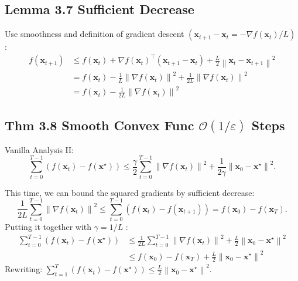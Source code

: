 \subsection*{Lemma 3.7 Sufficient Decrease}
Use smoothness and definition of gradient descent $\left(\mathbf{x}_{t+1}-\mathbf{x}_{t}=-\nabla f\left(\mathbf{x}_{t}\right) / L\right)$ :
$$
\begin{aligned}
f\left(\mathbf{x}_{t+1}\right) & \leq f\left(\mathbf{x}_{t}\right)+\nabla f\left(\mathbf{x}_{t}\right)^{\top}\left(\mathbf{x}_{t+1}-\mathbf{x}_{t}\right)+\frac{L}{2}\left\|\mathbf{x}_{t}-\mathbf{x}_{t+1}\right\|^{2} \\
&=f\left(\mathbf{x}_{t}\right)-\frac{1}{L}\left\|\nabla f\left(\mathbf{x}_{t}\right)\right\|^{2}+\frac{1}{2 L}\left\|\nabla f\left(\mathbf{x}_{t}\right)\right\|^{2} \\
&=f\left(\mathbf{x}_{t}\right)-\frac{1}{2 L}\left\|\nabla f\left(\mathbf{x}_{t}\right)\right\|^{2}
\end{aligned}
$$

\subsection*{Thm 3.8 Smooth Convex Func $\mathcal{O}(1 / \varepsilon)$ Steps }
Vanilla Analysis II:
$$
\sum_{t=0}^{T-1}\left(f\left(\mathbf{x}_{t}\right)-f\left(\mathbf{x}^{\star}\right)\right) \leq \frac{\gamma}{2} \sum_{t=0}^{T-1}\left\|\nabla f\left(\mathbf{x}_{t}\right)\right\|^{2}+\frac{1}{2 \gamma}\left\|\mathbf{x}_{0}-\mathbf{x}^{\star}\right\|^{2} .
$$

This time, we can bound the squared gradients by sufficient decrease:
$$
\frac{1}{2 L} \sum_{t=0}^{T-1}\left\|\nabla f\left(\mathbf{x}_{t}\right)\right\|^{2} \leq \sum_{t=0}^{T-1}\left(f\left(\mathbf{x}_{t}\right)-f\left(\mathbf{x}_{t+1}\right)\right)=f\left(\mathbf{x}_{0}\right)-f\left(\mathbf{x}_{T}\right) .
$$
Putting it together with $\gamma=1 / L$ :
$$
\begin{aligned}
\sum_{t=0}^{T-1}\left(f\left(\mathbf{x}_{t}\right)-f\left(\mathbf{x}^{\star}\right)\right) & \leq \frac{1}{2 L} \sum_{t=0}^{T-1}\left\|\nabla f\left(\mathbf{x}_{t}\right)\right\|^{2}+\frac{L}{2}\left\|\mathbf{x}_{0}-\mathbf{x}^{\star}\right\|^{2} \\
& \leq f\left(\mathbf{x}_{0}\right)-f\left(\mathbf{x}_{T}\right)+\frac{L}{2}\left\|\mathbf{x}_{0}-\mathbf{x}^{\star}\right\|^{2}
\end{aligned}
$$
Rewriting:
$
\sum_{t=1}^{T}\left(f\left(\mathbf{x}_{t}\right)-f\left(\mathbf{x}^{\star}\right)\right) \leq \frac{L}{2}\left\|\mathbf{x}_{0}-\mathbf{x}^{\star}\right\|^{2} .
$

